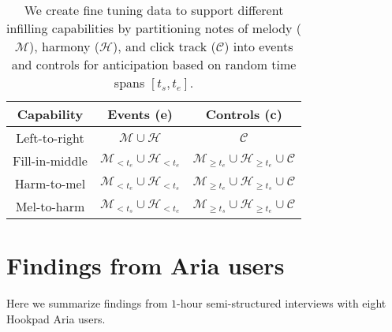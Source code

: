 \documentclass{article}
\newcommand\sysname{Hookpad Aria}
\begin{document}
\begin{table}[t]
\centering
\begin{tabular}{ccc}
\toprule
Capability          & Events ($\mathbf{e}$)                                       & Controls ($\mathbf{c}$)                                                  \\ \midrule
Left-to-right & $\mathcal{M} \cup \mathcal{H}$ & $\mathcal{C}$ \\
Fill-in-middle & $\mathcal{M}_{< t_e} \cup \mathcal{H}_{< t_e}$ & $\mathcal{M}_{\geq t_e} \cup \mathcal{H}_{\geq t_e} \cup \mathcal{C}$ \\
Harm-to-mel & $\mathcal{M}_{< t_e} \cup \mathcal{H}_{< t_s}$ & $\mathcal{M}_{\geq t_e} \cup \mathcal{H}_{\geq t_s} \cup \mathcal{C}$ \\
Mel-to-harm & $\mathcal{M}_{< t_s} \cup \mathcal{H}_{< t_e}$ & $\mathcal{M}_{\geq t_s} \cup \mathcal{H}_{\geq t_e} \cup \mathcal{C}$ \\
\bottomrule
\end{tabular}
\caption{We create fine tuning data to support different infilling capabilities by partitioning notes of melody ($\mathcal{M}$), harmony ($\mathcal{H}$), and click track ($\mathcal{C}$) into events and controls for anticipation based on random time spans $[t_s, t_e]$.}
\label{tab:partitions}
\vspace{-4mm}
\end{table}

\vspace{-3mm}
\section{Findings from Aria users}








Here we summarize findings from $1$-hour semi-structured interviews with eight \sysname{} users. 
\end{document}
